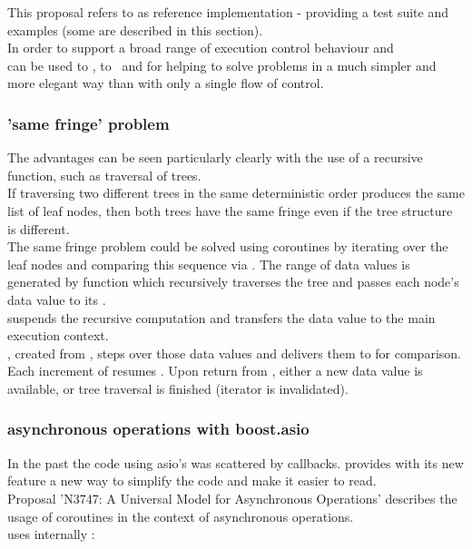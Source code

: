 
This proposal refers to \boostcoroutine as reference implementation - providing
a test suite and examples (some are described in this section).\\
\newline
In order to support a broad range of execution control behaviour \pushcoro and\\
\pullcoro can be used to \escrecloops, to \escreccomps~and for \coopmultitasking
helping to solve problems in a much simpler and more elegant way than with only
a single flow of control.

\subsubsection*{'same fringe' problem}
The advantages can be seen particularly clearly with the use of a recursive
function, such as traversal of trees.\\
If traversing two different trees in the same deterministic order produces the
same list of leaf nodes, then both trees have the same fringe even if the tree
structure is different.\\
\newline
The same fringe problem could be solved using coroutines by iterating over the
leaf nodes and comparing this sequence via . The range of data
values is generated by function  which recursively traverses the
tree and passes each node's data value to its \pushcoro.\\
\pushcoro suspends the recursive computation and transfers the data value to
the main execution context.\\
\pullcoroiterator, created from \pullcoro, steps over those data values and
delivers them to  for comparison. Each increment of \pullcoroiterator
resumes . Upon return from , either
a new data value is available, or tree traversal is finished (iterator is
invalidated).

\subsubsection*{asynchronous operations with boost.asio}
In the past the code using asio's \asyncops was scattered by callbacks.
\boostasio provides with its new \asyncres feature a new way to simplify the
code and make it easier to read.\\
Proposal 'N3747: A Universal Model for Asynchronous Operations'\cite{n3747}
describes the usage of coroutines in the context of asynchronous operations.\\
\yieldcontext uses internally \boostcoroutine:


